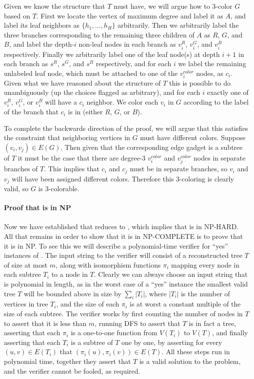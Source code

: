 Given we know the structure that $T$ must have,
we will argue how to 3-color $G$ based on $T$. First we
locate the vertex of maximum degree and label it as $A$,
and label its leaf neighbors as $\{h_1,\ldots,h_H\}$
arbitrarily. Then we arbitrarily label the three branches
corresponding to the remaining three children of $A$ as
$R$, $G$, and $B$, and label the depth-$i$ non-leaf nodes
in each branch as $v_i^R$, $v_i^G$, and $v_i^B$
respectively. Finally we arbitrarily label
one of the leaf node(s) at depth $i + 1$
in each branch as $s^R$, $s^G$, and $s^B$ respectively,
and for each $i$ we label the remaining unlabeled leaf node,
which must be attached to one of the $v_i^{color}$ nodes, as $c_i$.
Given what we have reasoned about
the structure of $T$ this is possible to do unambiguously (up
the choices flagged as arbitrary), and for
each $i$ exactly one of $v_i^R$, $v_i^G$, or $v_i^B$
will have a $c_i$ neighbor. We color each $v_i$ in $G$
according to the label of the branch that $c_i$ is in (either
$R$, $G$, or $B$).

To complete the backwards direction of the proof, we
will argue that this satisfies the constraint that neighboring
vertices in $G$ must have different colors. Suppose $(v_i, v_j) \in E(G)$.
Then given that the corresponding edge gadget is a subtree of $T$
it must be the case that there are degree-3 $v_i^{color}$
and $v_j^{color}$ nodes in separate
branches of $T$. This implies that $c_i$ and $c_j$ must be in separate
branches, so $v_i$ and $v_j$ will have been assigned different colors.
Therefore this 3-coloring is clearly valid, so $G$ is 3-colorable.\\
\\
{\bf Proof that \tr is in NP}\\
\\
Now we have established that \tc reduces to \tr, which implies
that \tr is in NP-HARD. All that remains in order to show that it is
in NP-COMPLETE is to prove that it is in NP. To see this we will
describe a polynomial-time verifier for ``yes'' instances of \tr.
The input string to the verifier will consist
of a reconstructed tree $T$ of
size at most $m$, along with isomorphism functions $\pi_i$ mapping every
node in each subtree $T_i$ to a node in $T$.
Clearly we can always choose an input string that is polynomial
in length, as in the worst case of a ``yes''
instance the smallest valid tree $T$
will be bounded above in size by $\sum_i{|T_i|}$, where
$|T_i|$ is the number of vertices in tree $T_i$,
and the size of each $\pi_i$ is at worst a constant multiple
of the size of each subtree. The verifier works by first counting
the number of nodes in $T$ to assert that it is less than $m$,
running DFS to assert that $T$ is in fact a tree, asserting that
each $\pi_i$ is a one-to-one function from $V(T_i)$ to $V(T)$,
and finally asserting that each $T_i$ is a subtree of $T$ one by one,
by asserting for every $(u, v) \in E(T_i)$ that
$(\pi_i(u), \pi_i(v)) \in E(T)$. All these steps run in polynomial time,
together they assert that $T$ is a valid solution to the problem, and
the verifier cannot be fooled, as required.



